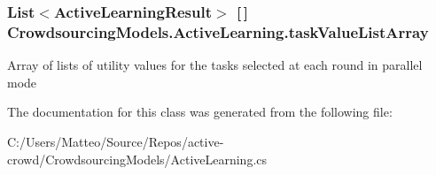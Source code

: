 \hypertarget{class_crowdsourcing_models_1_1_active_learning_a739a1b965a4539eedba478ae2bf0182b}{}
\subsubsection[{task\+Value\+List\+Array}]{\setlength{\rightskip}{0pt plus 5cm}List$<${\bf Active\+Learning\+Result}$>$ \mbox{[}$\,$\mbox{]} Crowdsourcing\+Models.\+Active\+Learning.\+task\+Value\+List\+Array\hspace{0.3cm}{\ttfamily [static]}}\label{class_crowdsourcing_models_1_1_active_learning_a739a1b965a4539eedba478ae2bf0182b}


Array of lists of utility values for the tasks selected at each round in parallel mode 



The documentation for this class was generated from the following file\+:\begin{DoxyCompactItemize}
\item 
C\+:/\+Users/\+Matteo/\+Source/\+Repos/active-\/crowd/\+Crowdsourcing\+Models/Active\+Learning.\+cs\end{DoxyCompactItemize}
